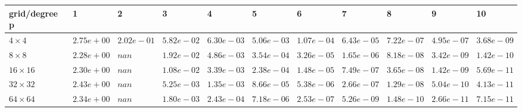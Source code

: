 \begin{tabular}{lllllllllll}
\hline
 grid/degree p   & 1          & 2          & 3          & 4          & 5          & 6          & 7          & 8          & 9          & 10         \\
\hline
 $4 \times 4$    & $2.75e+00$ & $2.02e-01$ & $5.82e-02$ & $6.30e-03$ & $5.06e-03$ & $1.07e-04$ & $6.43e-05$ & $7.22e-07$ & $4.95e-07$ & $3.68e-09$ \\
 $8 \times 8$    & $2.28e+00$ & $nan$      & $1.92e-02$ & $4.86e-03$ & $3.54e-04$ & $3.26e-05$ & $1.65e-06$ & $8.18e-08$ & $3.42e-09$ & $1.42e-10$ \\
 $16 \times 16$  & $2.30e+00$ & $nan$      & $1.08e-02$ & $3.39e-03$ & $2.38e-04$ & $1.48e-05$ & $7.49e-07$ & $3.65e-08$ & $1.42e-09$ & $5.69e-11$ \\
 $32 \times 32$  & $2.43e+00$ & $nan$      & $5.25e-03$ & $1.35e-03$ & $8.66e-05$ & $5.38e-06$ & $2.66e-07$ & $1.29e-08$ & $5.04e-10$ & $4.13e-11$ \\
 $64 \times 64$  & $2.34e+00$ & $nan$      & $1.80e-03$ & $2.43e-04$ & $7.18e-06$ & $2.53e-07$ & $5.26e-09$ & $1.48e-10$ & $2.66e-11$ & $7.15e-11$ \\
\hline
\end{tabular}